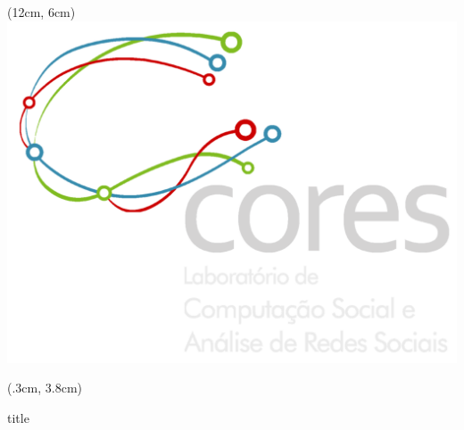 \documentclass[aspectratio=169,10pt,xcolor={dvipsnames}]{beamer}
\begin{document}
{\begin{frame}
        \begin{textblock*}{\textwidth}(12cm, 6cm)
          \includegraphics[scale=.15]{./Graphics/logo_lab_fundopreto.png}
        \end{textblock*}

        \vspace*{-.2cm}
        \hspace*{-.5cm}
        \begin{textblock*}{\textwidth}(.3cm, 3.8cm)
            {\inserttitlegraphic\par}
            \begin{beamercolorbox}[sep=8pt, 
                                   left, 
                                   colsep=-4bp, 
                                   rounded=true, 
                                   shadow=true]{title}
            \inserttitle
            \par%
                \ifx
                    \insertsubtitle
                    \vspace*{-10cm}
                    \@empty%
                    \else%
                    \vskip0.18cm%
                    \hspace{.4cm}
                    {
                    \insertsubtitle
                    \par}%
                \fi%
            \end{beamercolorbox}%



\end{textblock*}
\end{frame}}
\end{document}
